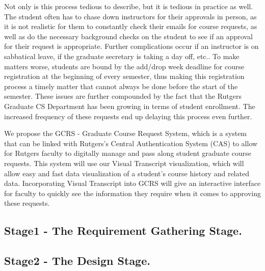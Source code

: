 \documentclass[10pt,conference]{IEEEtran}
\begin{document}
Not only is this process tedious to describe, but it is tedious in practice as well. The student often has to chase down instructors for their approvals in person, as it is not realistic for them to constantly check their emails for course requests, as well as do the necessary background checks on the student to see if an approval for their request is appropriate. Further complications occur if an instructor is on sabbatical leave, if the graduate secretary is taking a day off, etc.. To make matters worse, students are bound by the add/drop week deadline for course registration at the beginning of every semester, thus making this registration process a timely matter that cannot always be done before the start of the semester. These issues are further compounded by the fact that the Rutgers Graduate CS Department has been growing in terms of student enrollment. The increased frequency of these requests end up delaying this process even further. 

We propose the GCRS - Graduate Course Request System, which is a system that can be linked with Rutgers's Central Authentication System (CAS) to allow for Rutgers faculty to digitally manage and pass along student graduate course requests. This system will use our Visual Transcript visualization, which will allow easy and fast data visualization of a student's course history and related data. Incorporating Visual Transcript into GCRS will give an interactive interface for faculty to quickly see the information they require when it comes to approving these requests. 

%
\subsection{Stage1 - The Requirement Gathering Stage. }\label{sec:1 Requirement Gathering Stage. }


\subsection{Stage2 - The Design Stage. }\label{sec: 2:The Design Stage.}

\end{document}
